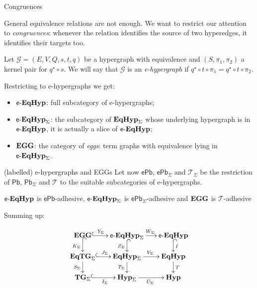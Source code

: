 \documentclass{beamer}
\newcommand{\catname}[1]{\textbf{\textup{#1}}}
\newcommand{\tg}[0]{\catname{TG}_{\Sigma}}
\newcommand{\eg}{\catname{EGG}}
\newcommand{\egg}{\mathsf{e}\text{-}\catname{EqHyp}}
\newcommand{\hyp}{\catname{Hyp}}
\newcommand{\EqHyp}{\catname{EqHyp}} %
\newcommand{\EqTG}{\catname{EqTG}}
\newcommand{\pbc}{\mathsf{Pb}}
\newcommand{\pbe}{\mathsf{ePb}}
\begin{document}
\begin{frame}{Congruences}

General equivalence relations are not enough. We want to restrict our attention to \emph{congruences}: whenever the relation identifies the source of two hyperedges, it identifies their targets too. 
	
\pause 

\begin{definition}\justifying 
	Let $\mathcal{G} = (E, V, Q, s, t, q)$ be a hypergraph with equivalence and $(S, \pi_1, \pi_2)$ a kernel pair for $q^\star \circ s$.
We will say that $\mathcal{G}$ is an \emph{e-hypergraph} if $q^\star \circ t \circ \pi_1 = q^\star \circ t \circ \pi_2$.
\end{definition}	
	
	\pause 
	Restricting to e-hypergraphs we get: \pause 
\begin{itemize}\justifying
	\item $\egg$: full subcategory of e-hypergraphs; \pause 
	\item $\egg_\Sigma$: the subcategory of $\EqHyp_\Sigma$ whose underlying hypergraph is in $\egg$, it is actually a slice of $\egg$; \pause 
	\item $\eg$: the category of \emph{eggs}: term graphs with equivalence lying in $\egg_\Sigma$.
\end{itemize}	
	
\end{frame}



\begin{frame}{(labelled) e-hypergraphs and EGGs }
	Let now $\pbe$, $\pbe_\Sigma$ and $\mathcal{T}_\Sigma$ be the restriction of $\pbc$, $\pbc_\Sigma$ and $\mathcal{T}$ to the suitable subcategories of e-hypergraphs. 
	
	\pause 
	\begin{theorem}
	$\egg$ is $\pbe$-adhesive, $\egg_\Sigma$ is $\pbe_\Sigma$-adhesive and $\eg$ is $\mathcal{T}$-adhesive
	\end{theorem}
\end{frame}

\begin{frame}
	
	Summing up:
	
	\[\xymatrix@R=15pt@C=15pt{ \eg \ar@{^{(}->}[r]^-{Y_\Sigma} \ar@{^{(}->}[d]_{K_\Sigma} & \egg_\Sigma \ar@{^{(}->}[d]_{ Z_\Sigma} \ar[r]^{W_\Sigma}& \egg \ar@{^{(}->}[d]^{I}\\ \EqTG_{\Sigma} \ar@{^{(}->}[r]^{J_\Sigma}\ar[d]_{S_\Sigma}& \EqHyp_\Sigma \ar[r]^{V_\Sigma} \ar[d]_{T_\Sigma}& \EqHyp \ar[d]^{T}\\ \tg \ar@{^{(}->}[r]_{I_\Sigma}& \hyp_{\Sigma} \ar[r]_{U_\Sigma}  &\hyp}\]
	
	
\end{frame}
\end{document}
